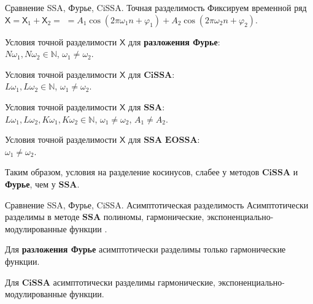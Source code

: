\documentclass[notheorems, handout]{beamer}
\newcommand{\SSA}{\textbf{SSA}}
\newcommand{\EOSSA}{\textbf{EOSSA}}
\newcommand{\CISSA}{\textbf{CiSSA}}
\newcommand{\TS}{\mathsf{X}}
\begin{document}
	\begin{frame}{Сравнение SSA, Фурье, CiSSA. Точная разделимость}
		Фиксируем временной ряд $\TS = \TS_{1} + \TS_{2} =$ $= A_1 \cos(2\pi \omega_1 n + \varphi_1) + A_2 \cos(2\pi \omega_2 n + \varphi_2)$.

		\bigskip
		Условия точной разделимости $\TS$ для \textbf{разложения Фурье}: \\
		$N\omega_1, N\omega_2 \in \mathbb{N}$, $\omega_1 \not = \omega_2$.

		\medskip
		Условия точной разделимости $\TS$ для $\CISSA$: \\
		$L\omega_1, L\omega_2 \in \mathbb{N}$, $\omega_1 \not = \omega_2$.
		
		\medskip
		Условия точной разделимости $\TS$ для $\SSA$: \\
		$L\omega_1, L\omega_2, K\omega_1, K\omega_2 \in \mathbb{N}$, $\omega_1 \not = \omega_2$, $A_1 \not = A_2$.

		\medskip
		Условия точной разделимости $\TS$ для $\SSA$ $\EOSSA$: \\
		$\omega_1 \not = \omega_2$.

		\bigskip
		Таким образом, условия на разделение косинусов, слабее у методов $\CISSA$ и \textbf{Фурье}, чем у $\SSA$.
	\end{frame}


	\begin{frame}{Сравнение SSA, Фурье, CiSSA. Асимптотическая разделимость}
		Асимптотически разделимы в методе $\SSA$ полиномы, гармонические, экспоненциально-модулированные функции \parencite{golyandina2001analysis}.
		
		\medskip

		Для \textbf{разложения Фурье} асимптотически разделимы только гармонические функции.

		\medskip

		Для $\CISSA$ асимптотически разделимы гармонические, экспоненциально-модулированные функции.

	\end{frame}
	
\end{document}
